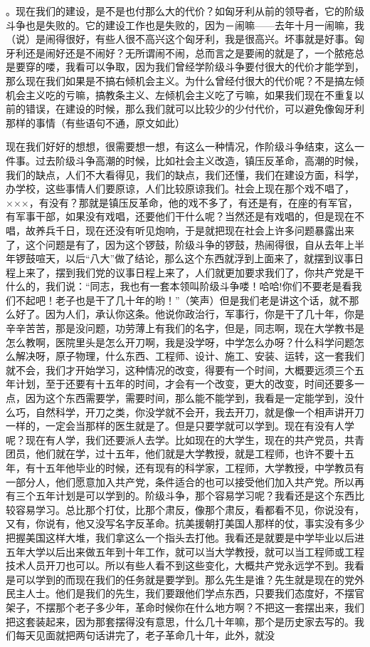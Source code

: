 。现在我们的建设，是不是也付那么大的代价？如匈牙利从前的领导者，它的阶级斗争也是失败的。它的建设工作也是失败的，因为－闹嘛——去年十月一闹嘛，我（说）是闹得很好，有些人很不高兴这个匈牙利，我是很高兴。坏事就是好事。匈牙利还是闹好还是不闹好？无所谓闹不闹，总而言之是要闹的就是了，一个脓疮总是要穿的喽，我看可以争取，因为我们曾经学阶级斗争要付很大的代价才能学到，那么现在我们如果是不搞右倾机会主义。为什么曾经付很大的代价呢？不是搞左倾机会主义吃的亏嘛，搞教条主义、左倾机会主义吃了亏嘛，如果我们现在不重复以前的错误，在建设的时候，那么我们就可以比较少的少付代价，可以避免像匈牙利那样的事情（有些语句不通，原文如此）

现在我们好好的想想，很需要想一想，有这么一种情况，作阶级斗争结束，这么一件事。过去阶级斗争高潮的时候，比如社会主义改造，镇压反革命，高潮的时候，我们的缺点，人们不大看得见，我们的缺点，我们还懂，我们在建设方面，科学，办学校，这些事情人们要原谅，人们比较原谅我们。社会上现在那个戏不唱了，×××，有没有？那就是镇压反革命，他的戏不多了，有还是有，在座的有军官，有军事干部，如果没有戏唱，还要他们干什么呢？当然还是有戏唱的，但是现在不唱，故养兵千日，现在还没有听见炮响，于是就把现在社会上许多问题暴露出来了，这个问题是有了，因为这个锣鼓，阶级斗争的锣鼓，热闹得很，自从去年上半年锣鼓喧天，以后“八大”做了结论，那么这个东西就浮到上面来了，就摆到议事日程上来了，摆到我们党的议事日程上来了，人们就更加要求我们了，你共产党是干什么的，我们说：“同志，我也有一套本领叫阶级斗争喽！哈哈!你们不要老是看我们不起吧！老子也是干了几十年的哟！”（笑声）但是我们老是讲这个话，就不那么好了。因为人们，承认你这条。他说你政治行，军事行，你是干了几十年，你是辛辛苦苦，那是没问题，功劳薄上有我们的名字，但是，同志啊，现在大学教书是怎么教啊，医院里头是怎么开刀啊，我是没学呀，中学怎么办呀？什么科学问题怎么解决呀，原子物理，什么东西、工程师、设计、施工、安装、运转，这一套我们就不会，我们才开始学习，这种情况的改变，得要有一个时间，大概要远须三个五年计划，至于还要有十五年的时间，才会有一个改变，更大的改变，时间还要多一点，因为这个东西需要学，需要时间，那么能不能学到，我看是一定能学到，没什么巧，自然科学，开刀之类，你没学就不会开，我去开刀，就是像一个相声讲开刀一样的，一定会当那样的医生就是了。但是只要学就可以学到。现在有没有人学呢？现在有人学，我们还要派人去学。比如现在的大学生，现在的共产党员，共青团员，他们就在学，过十五年，他们就是大学教授，就是工程师，也许不要十五年，有十五年他毕业的时候，还有现有的科学家，工程师，大学教授，中学教员有一部分人，他们愿意加入共产党，条件适合的也可以接受他们加入共产党。所以再有三个五年计划是可以学到的。阶级斗争，那个容易学习呢？我看还是这个东西比较容易学习。总比那个打仗，比那个肃反，像那个肃反，看都看不见，你说没有，又有，你说有，他又没写名字反革命。抗美援朝打美国人那样的仗，事实没有多少把握美国这样大堆，我们拿这么一个指头去打他。我看还是就要是中学毕业以后进五年大学以后出来做五年到十年工作，就可以当大学教授，就可以当工程师或工程技术人员开刀也可以。所以有些人看不到这些变化，大概共产党永远学不到。我看是可以学到的而现在我们的任务就是要学到。那么先生是谁？先生就是现在的党外民主人士。他们是我们的先生，我们要跟他们学点东西，只要我们态度好，不摆官架子，不摆那个老子多少年，革命时候你在什么地方啊？不把这一套摆出来，我们把这套装起来，因为那套摆得没有意思，什么几十年嘛，那个是历史家去写的。我们每天见面就把两句话讲完了，老子革命几十年，此外，就没